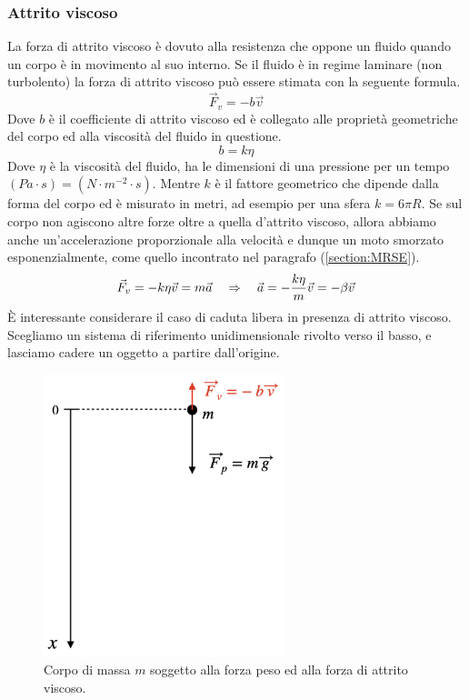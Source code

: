 \subsubsection{Attrito viscoso}
La forza di attrito viscoso è dovuto alla resistenza che oppone un fluido
quando un corpo è in movimento al suo interno. Se il fluido è in regime
laminare (non turbolento) la forza di attrito viscoso può essere stimata
con la seguente formula.
\begin{equation}
    \vec F_v = -b\vec v
\label{eq:forces:viscous}
\end{equation}
Dove $b$ è il coefficiente di attrito viscoso ed è collegato alle proprietà
geometriche del corpo ed alla viscosità del fluido in questione.
\begin{equation}
    b = k\eta
\label{eq:forces:viscous_coefficient}
\end{equation}
Dove $\eta$ è la viscosità del fluido, ha le dimensioni di una pressione per
un tempo $(Pa \cdot s) =(N\cdot m^{-2}\cdot s)$. Mentre $k$ è il fattore
geometrico che dipende dalla forma del corpo ed è misurato in metri, ad
esempio per una sfera $k = 6\pi R$.
Se sul corpo non agiscono altre forze oltre a quella d'attrito viscoso,
allora abbiamo anche un'accelerazione proporzionale alla velocità e dunque
un moto smorzato esponenzialmente, come quello incontrato nel paragrafo (\ref{section:MRSE}).
\begin{equation}
    \vec F_v = -k\eta\vec v = m\vec a \quad\Rightarrow\quad
    \vec a = -\frac{k\eta}m\vec v =-\beta \vec v 
\end{equation}
È interessante considerare il caso di caduta libera in presenza di attrito
viscoso. Scegliamo un sistema di riferimento unidimensionale rivolto verso
il basso, e lasciamo cadere un oggetto a partire dall'origine.
\begin{figure}[htbp]
    \begin{center}
        \includegraphics[width=7cm]{images/cadlibera.png}
        \caption{Corpo di massa $m$ soggetto alla forza peso ed
        alla forza di attrito viscoso.}
\end{center}
\label{fig:forces:freefall}
\end{figure}
